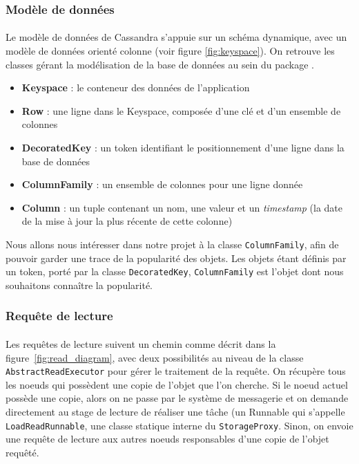 \documentclass[12pt]{article}
\newcommand{\class}[1]{\texttt{#1}}
\begin{document}
\subsubsection{Modèle de données}

\paragraph{} Le modèle de données de Cassandra s'appuie sur un schéma dynamique, avec un modèle de données orienté colonne (voir figure \ref{fig:keyspace}). On retrouve les classes gérant la modélisation de la base de données au sein du package .

\begin{itemize}
	\item \textbf{Keyspace} : le conteneur des données de l'application
	\item \textbf{Row} : une ligne dans le Keyspace, composée d'une clé et d'un ensemble de colonnes
	\item \textbf{DecoratedKey} : un token identifiant le positionnement d'une ligne dans la base de données
	\item \textbf{ColumnFamily} : un ensemble de colonnes pour une ligne donnée
	\item \textbf{Column} : un tuple contenant un nom, une valeur et un \textit{timestamp} (la date de la mise à jour la plus récente de cette colonne)
\end{itemize}

Nous allons nous intéresser dans notre projet à la classe \class{ColumnFamily}, afin de pouvoir garder une trace de la popularité des objets. Les objets étant définis par un token, porté par la classe \class{DecoratedKey}, \class{ColumnFamily} est l'objet dont nous souhaitons connaître la popularité.

\subsubsection{Requête de lecture}

\paragraph{}Les requêtes de lecture suivent un chemin comme décrit dans la figure~\ref{fig:read_diagram}, avec deux possibilités au niveau de la classe \class{AbstractReadExecutor} pour gérer le traitement de la requête. On récupère tous les noeuds qui possèdent une copie de l'objet que l'on cherche. Si le noeud actuel possède une copie, alors on ne passe par le système de messagerie et on demande directement au stage de lecture de réaliser une tâche (un Runnable qui s'appelle \class{LoadReadRunnable}, une classe statique interne du \class{StorageProxy}. Sinon, on envoie une requête de lecture aux autres noeuds responsables d'une copie de l'objet requêté.
\end{document}
